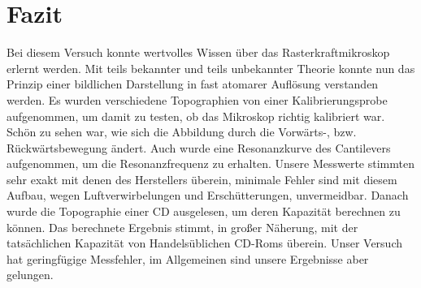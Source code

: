 \chapter{Fazit}

Bei diesem Versuch konnte wertvolles Wissen über das Rasterkraftmikroskop erlernt werden.
Mit teils bekannter und teils unbekannter Theorie konnte nun das Prinzip einer bildlichen Darstellung in fast atomarer Auflösung verstanden werden.
Es wurden verschiedene Topographien von einer Kalibrierungsprobe aufgenommen, um damit zu testen, ob das Mikroskop richtig kalibriert war.
Schön zu sehen war, wie sich die Abbildung durch die Vorwärts-, bzw. Rückwärtsbewegung ändert.
Auch wurde eine Resonanzkurve des Cantilevers aufgenommen, um die Resonanzfrequenz zu erhalten.
Unsere Messwerte stimmten sehr exakt mit denen des Herstellers überein, minimale Fehler sind mit diesem Aufbau, wegen Luftverwirbelungen und Erschütterungen, unvermeidbar.
Danach wurde die Topographie einer CD ausgelesen, um deren Kapazität berechnen zu können.
Das berechnete Ergebnis stimmt, in großer Näherung, mit der tatsächlichen Kapazität von Handelsüblichen CD-Roms überein.
Unser Versuch hat geringfügige Messfehler, im Allgemeinen sind unsere Ergebnisse aber gelungen.
